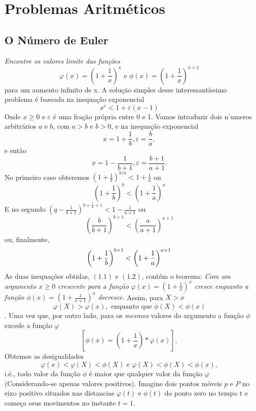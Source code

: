\chapter{Problemas Aritméticos}
\section{O Número de Euler}
\textit{Encontre os valores limite das funções}
$$\varphi(x) = \left( 1 + \frac{1}{x}\right)^{x} \textrm{ e } \phi(x) = \left(1 + \frac{1}{x}\right)^{x+1}$$
para um aumento infinito de x.
A solução simples desse interessantíssimo problema é baseada na inequação exponencial
$$x^{\varepsilon} < 1 + \varepsilon(x - 1)$$
Onde $x \geq 0$ e $\varepsilon$ é uma fração própria entre 0 e 1.
Vamos introduzir dois n'umeros arbitrários $a$ e $b$, com $a>b$ e $b>0$, e na inequação exponencial
$$x = 1 + \frac{1}{b}, \varepsilon = \frac{b}{a},$$
e então
$$x = 1 - \frac{1}{b+1}, \varepsilon = \frac{b + 1}{a + 1}.$$
No primeiro caso obteremos $\left(1 + \frac{1}{b}\right)^{b/a} < 1 + \frac{1}{a}$ ou
\begin{equation}
\left(1 + \frac{1}{b} \right)^{b} < \left( 1 + \frac{1}{a}\right)^{a}
\end{equation}
E no segundo    $\left(q - \frac{1}{b+1}\right)^{b+\frac{1}{a}+1} < 1 - \frac{1}{a + 1}$ ou
$$\left(\frac{b}{b + 1}\right)^{b+1} < \left(\frac{a}{a + 1}\right)^{a+1}$$
ou, finalmente,
\begin{equation}
\left(1 + \frac{1}{b} \right)^{b+1} < \left( 1 + \frac{1}{a}\right)^{a+1}\\
\end{equation}
As duas inequações obtidas, $(1.1)$ e $(1.2)$, contém o teorema:
\textit{Com um argumento $x \geq 0$  crescente para a função $\varphi(x) = \left(1 + \frac{1}{x} \right)^{x}$ cresce enquanto a função $\phi(x) = \left(1 + \frac{1}{x+1} \right)^{x}$ decresce.} 
Assim, para $X > x$
$$\varphi(X) > \varphi(x), \textrm{ enquanto que } \phi(X) < \phi(x)$$.
Uma vez que, por outro lado, para os \textit{mesmos} valores do argumento a função $\phi$ excede a função $\varphi$ 
$$\left[ \phi(x) = \left( 1 + \frac{1}{x}\right)*\varphi(x)\right],$$
Obtemos as desigualdades
$$\varphi(x) < \varphi(X) < \phi(X) \textrm{ e } \varphi(X) < \phi(X) < \phi(x),$$
i.é., todo valor da função $\phi$ é maior que qualquer valor da função $\varphi$ (Considerando-se apenas valores positivos).
Imagine dois pontos móveis $p$ e $P$ no eixo positivo situados nas distancias $\varphi(t)$ e $\phi(t)$ do ponto zero no tempo t e começa seus movimentos no instante $t = 1$. 
